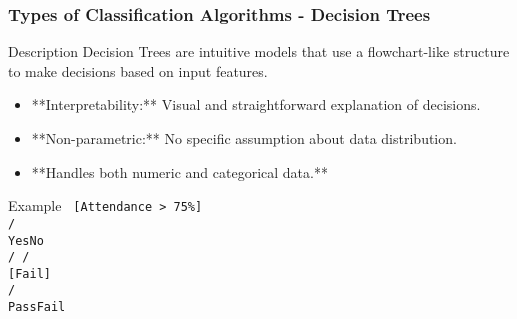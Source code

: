 \documentclass{beamer}
\begin{document}
\begin{frame}[fragile]
    \frametitle{Types of Classification Algorithms - Decision Trees}
    \begin{block}{Description}
    Decision Trees are intuitive models that use a flowchart-like structure to make decisions based on input features.
    \end{block}
    
    \begin{itemize}
        \item **Interpretability:** Visual and straightforward explanation of decisions.
        \item **Non-parametric:** No specific assumption about data distribution.
        \item **Handles both numeric and categorical data.**
    \end{itemize}
    
    \begin{block}{Example}
    \texttt{
    [Attendance > 75\%] \\
    \hspace{2cm}/\hspace{2cm} \\
    \hspace{2cm}Yes\hspace{2cm}No\\
    \hspace{2cm}/\hspace{2cm} \hspace{2cm}/\hspace{2cm} \\
    [Hours > 5] \hspace{1cm}[Fail] \\
    \hspace{4cm}/\hspace{2cm} \hspace{2cm} \\
    \hspace{4cm}Pass\hspace{2cm}Fail  
    }
    \end{block}
\end{frame}
\end{document}
